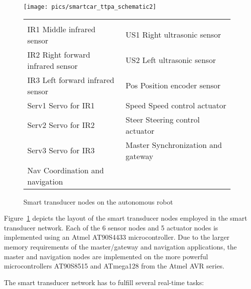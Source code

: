 \documentclass[11pt,a4paper,]{article}
\begin{document}
\begin{figure}[thb]
 \begin{center}
  \newlength\breite
  \setlength{\breite}{.7\textwidth}
  \texttt{[image: pics/smartcar\_ttpa\_schematic2]}
\footnotesize
  \begin{tabular}{p{.47\breite}p{.47\breite}}
  & \\
  IR1 \dotfill Middle infrared sensor        & US1 \dotfill Right ultrasonic sensor\\
  IR2 \dotfill Right forward infrared sensor & US2 \dotfill Left ultrasonic sensor\\
  IR3 \dotfill Left forward infrared sensor  & Pos \dotfill Position encoder sensor\\
  Serv1 \dotfill Servo for IR1               & Speed \dotfill Speed control actuator\\
  Serv2 \dotfill Servo for IR2               & Steer \dotfill Steering control actuator\\
  Serv3 \dotfill Servo for IR3               & Master \dotfill Synchronization and gateway\\
  Nav \dotfill Coordination and navigation & \\
  \end{tabular}
 \end{center}

  \caption{Smart transducer nodes on the autonomous robot}
  \label{fig:smartcar_architecture}
\end{figure}

Figure~\ref{fig:smartcar_architecture} depicts the layout of the
smart transducer nodes employed in the smart transducer network.
Each of the 6 sensor nodes and 5 actuator nodes is implemented
using an Atmel AT90S4433 microcontroller. Due to the larger memory
requirements of the master/gateway and navigation applications,
the master and navigation nodes are implemented on the more
powerful microcontrollers AT90S8515 and ATmega128 from the Atmel
AVR series.

The smart transducer network has to fulfill several real-time
tasks:
\end{document}
